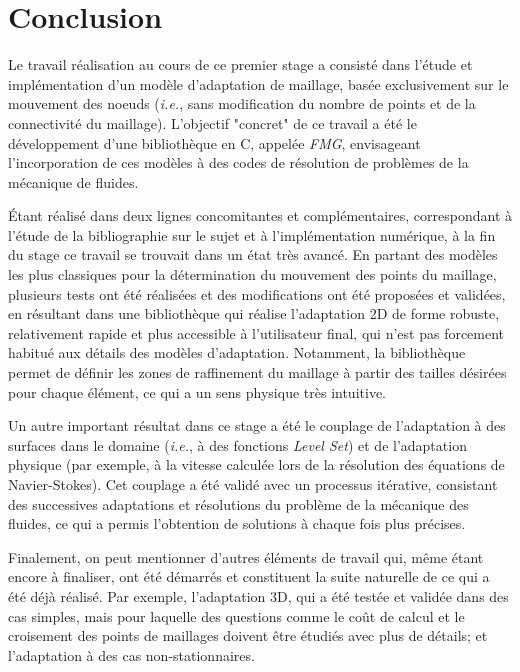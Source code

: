 \section{Conclusion}

\indent Le travail réalisation au cours de ce premier stage a consisté dans l'étude et implémentation d'un modèle d'adaptation de maillage, basée exclusivement sur le mouvement des noeuds (\emph{i.e.}, sans modification du nombre de points et de la connectivité du maillage). L'objectif "concret" de ce travail a été le développement d'une bibliothèque en C, appelée \emph{FMG}, envisageant l'incorporation de ces modèles à des codes de résolution de problèmes de la mécanique de fluides.

\indent Étant réalisé dans deux lignes concomitantes et complémentaires, correspondant à l'étude de la bibliographie sur le sujet et à l'implémentation numérique, à la fin du stage ce travail se trouvait dans un état très avancé. En partant des modèles les plus classiques pour la détermination du mouvement des points du maillage, plusieurs tests ont été réalisées et des modifications ont été proposées et validées, en résultant dans une bibliothèque qui réalise l'adaptation 2D de forme robuste, relativement rapide et plus accessible à l'utilisateur final, qui n'est pas forcement habitué aux détails des modèles d'adaptation. Notamment, la bibliothèque permet de définir les zones de raffinement du maillage à partir des tailles désirées pour chaque élément, ce qui a un sens physique très intuitive.

\indent Un autre important résultat dans ce stage a été le couplage de l'adaptation à des surfaces dans le domaine (\emph{i.e.}, à des fonctions \emph{Level Set}) et de l'adaptation physique (par exemple, à la vitesse calculée lors de la résolution des équations de Navier-Stokes). Cet couplage a été validé avec un processus itérative, consistant des successives adaptations et résolutions du problème de la mécanique des fluides, ce qui a permis l'obtention de solutions à chaque fois plus précises.

\indent Finalement, on peut mentionner d'autres éléments de travail qui, même étant encore à finaliser, ont été démarrés et constituent la suite naturelle de ce qui a été déjà réalisé. Par exemple, l'adaptation 3D, qui a été testée et validée dans des cas simples, mais pour laquelle des questions comme le coût de calcul et le croisement des points de maillages doivent être étudiés avec plus de détails; et l'adaptation à des cas non-stationnaires.

  